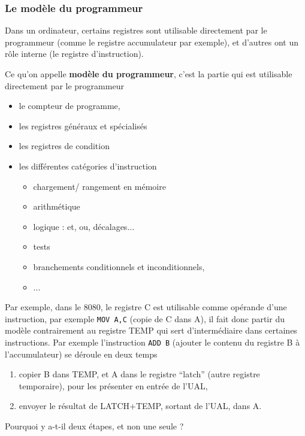 \begin{multicols}{2}

\subsubsection{Le modèle du programmeur}

Dans un ordinateur, certains registres sont utilisable directement par le
programmeur (comme le registre accumulateur par exemple), et d'autres ont
un rôle interne (le registre d'instruction).

Ce qu'on appelle \textbf{modèle du programmeur}, c'est la partie
qui est utilisable directement par le programmeur
\begin{itemize}
\item le compteur de programme,
\item les registres généraux et spécialisés
\item les registres de condition
\item les différentes catégories d'instruction
\begin{itemize}
\item chargement/ rangement en mémoire
\item arithmétique
\item logique : et, ou, décalages...
\item tests
\item branchements conditionnels et inconditionnels,
\item ...
\end{itemize}
\end{itemize}

Par exemple, dans le 8080, le registre C est utilisable comme opérande
d'une instruction, par exemple \texttt{MOV A,C} (copie de C dans A),
il fait donc partir du modèle contrairement au registre TEMP qui sert
d'intermédiaire dans certaines instructions. Par exemple l'instruction
\texttt{ADD B} (ajouter le contenu du registre B à l'accumulateur) se
déroule en deux temps
\begin{enumerate}
\item copier B dans TEMP, 
et A dans le registre ``latch'' (autre registre temporaire), pour les présenter en entrée de l'UAL,
\item envoyer le résultat de LATCH+TEMP, sortant de l'UAL, dans A.
\end{enumerate}

\begin{exercice}
Pourquoi y a-t-il deux étapes, et non une seule ?
\end{exercice}



\end{multicols}
